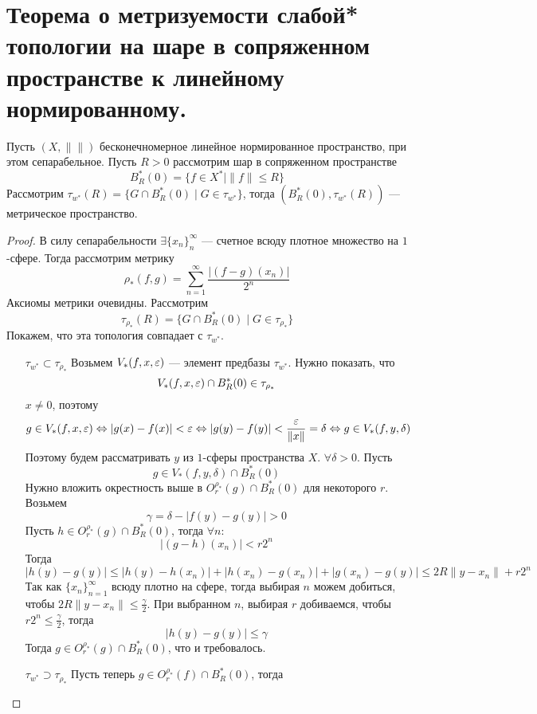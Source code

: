 \newpage
\section{Теорема о метризуемости слабой* топологии на шаре в сопряженном пространстве к линейному нормированному.}


\begin{claim}
	Пусть $(X, \|\|)$ бесконечномерное линейное нормированное пространство, при этом сепарабельное. Пусть $ R > 0$ рассмотрим шар в сопряженном пространстве 
	$$
	B_R^*(0) = \{f \in X^* \mid \|f\| \leq R\}
	$$
	Рассмотрим $\tau_{w^*}(R) = \{G \cap B_R^*(0) \mid G \in \tau_{w^*}\}$, тогда $(B_R^*(0), \tau_{w^*}(R))$ --- метрическое пространство.
\end{claim}
\begin{proof}
	В силу сепарабельности $\exists \{x_n\}_n^\infty$ --- счетное всюду плотное множество на $1$-сфере. Тогда рассмотрим метрику 
	$$
	\rho_*(f,g) = \sum_{n=1}^{\infty} \frac{|(f-g)(x_n)|}{2^n}
	$$
	Аксиомы метрики очевидны. Рассмотрим 
	$$
	\tau_{\rho_*}(R) = \{G \cap B_R^*(0) \mid G \in \tau_{\rho_*}\}
	$$
	Покажем, что эта топология совпадает с $\tau_{w^*}$.
	\begin{enumerate}
		\item[$\tau_{w^*} \subset \tau_{\rho_*}$] Возьмем $V_*(f,x,\varepsilon)$ --- элемент предбазы $\tau_{w^*}$. Нужно показать, что 
		$$
		V_*(f,x,\varepsilon) \cap B_R^*(0)  \in \tau_{\rho_*}
		$$
		$x \neq 0$, поэтому 
		$$
		g \in V_*(f,x,\varepsilon) \Leftrightarrow |g(x) - f(x)| < \varepsilon \Leftrightarrow |g(y) - f(y)| < \frac{\varepsilon}{\|x\|} = \delta \Leftrightarrow g \in V_*(f,y,\delta)
		$$
		Поэтому будем рассматривать $y$ из $1$-сферы пространства $X$. $\forall \delta > 0$. Пусть 
		$$
		g\in V_*(f,y,\delta) \cap B_R^*(0) 
		$$
		Нужно вложить окрестность выше в $O_r^{\rho_*}(g) \cap B_R^*(0)$ для некоторого $r$. Возьмем 
		$$
		\gamma = \delta - |f(y) - g(y)| > 0
		$$
		Пусть $h \in O_r^{\rho_*}(g) \cap B_R^*(0)$, тогда $\forall n$:
		$$
		|(g-h)(x_n)| < r 2^n
		$$
		Тогда 
		$$
		|h(y) - g(y) | \leq |h(y) - h(x_n)| + |h(x_n) - g(x_n)| + |g(x_n) - g(y)| \leq 2R\|y - x_n\| + r2^n 
		$$
		Так как $\{x_n\}_{n=1}^\infty$ всюду плотно на сфере, тогда выбирая $n$ можем добиться, чтобы $2R\|y - x_n\| \leq \frac{\gamma}{2}$. При выбранном $n$, выбирая $r$ добиваемся, чтобы $r2^n \leq \frac{\gamma}{2}$, тогда
		$$
		|h(y) - g(y)| \leq \gamma
		$$
		Тогда $g \in  O_r^{\rho_*}(g) \cap B_R^*(0)$, что и требовалось.
		\item[$\tau_{w^*} \supset \tau_{\rho_*}$] Пусть теперь $ g \in O_r^{\rho_*}(f) \cap B_R^*(0)$, тогда 

\end{enumerate}
\end{proof}

